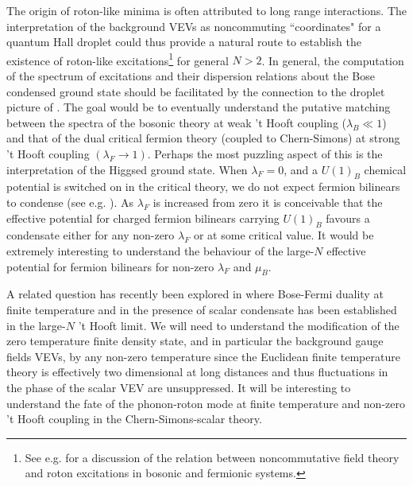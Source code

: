 The  origin of roton-like minima is often attributed to long range interactions. The interpretation of the background VEVs as noncommuting ``coordinates" for a quantum Hall droplet could thus provide a natural route to establish the existence of roton-like excitations\footnote{See e.g. \cite{Castorina:2004yd} for a discussion of the relation between noncommutative field theory and roton excitations in bosonic and fermionic systems.} for general $N>2$.  In general, the computation of the spectrum of excitations and their dispersion relations about the Bose condensed ground state should be facilitated by the connection to the droplet picture of \cite{Polychronakos:2001mi}. The goal would be to eventually understand the putative matching between the  spectra of the bosonic theory at weak 't Hooft coupling ($\lambda_B\ll 1$) and that of the dual critical fermion theory (coupled to Chern-Simons) at strong 't Hooft coupling $(\lambda_F\to 1)$. Perhaps the most puzzling aspect of this is the interpretation of the Higgsed ground state. When $\lambda_F=0$, and a $U(1)_B$ chemical potential is switched on in the critical theory, we do not  expect fermion bilinears to condense (see e.g. \cite{Hands:1998he}). As $\lambda_F$ is increased from zero it is conceivable that the effective potential for charged fermion bilinears carrying $U(1)_B$ favours a condensate either for any non-zero $\lambda_F$ or at some critical value. It would be extremely interesting to understand the behaviour of the large-$N$ effective potential for fermion bilinears for non-zero $\lambda_F$ and $\mu_B$.



 A related question has recently been explored in \cite{Choudhury:2018iwf} where Bose-Fermi duality at finite temperature and in the presence of scalar condensate has been established in the large-$N$ 't Hooft limit. We will need to understand  the modification of the zero temperature finite density state, and in particular the background gauge fields VEVs, by any non-zero temperature since the  Euclidean finite temperature theory is effectively two dimensional at long distances and thus fluctuations in the  phase of the scalar VEV are unsuppressed.  It will be interesting to understand the fate of the phonon-roton mode at finite temperature and non-zero 't Hooft coupling in the Chern-Simons-scalar theory.


\newpage

